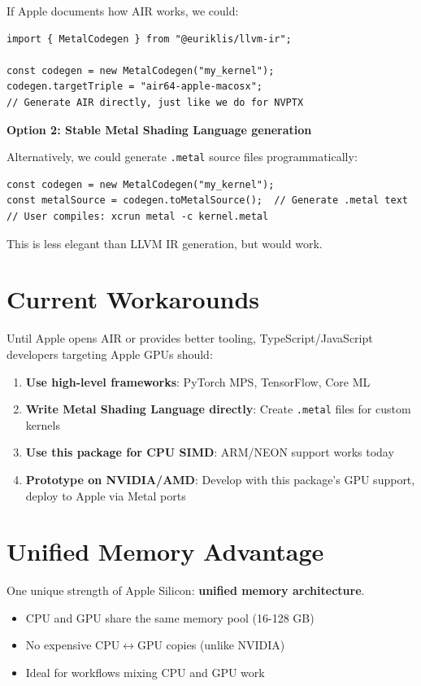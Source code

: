 \documentclass[11pt,oneside]{book}
\begin{document}
If Apple documents how AIR works\cite{airformat}, we could:
\begin{lstlisting}[style=ts]
import { MetalCodegen } from "@euriklis/llvm-ir";

const codegen = new MetalCodegen("my_kernel");
codegen.targetTriple = "air64-apple-macosx";
// Generate AIR directly, just like we do for NVPTX
\end{lstlisting}

\textbf{Option 2: Stable Metal Shading Language generation}

Alternatively, we could generate \texttt{.metal} source files programmatically\cite{metaltools}:
\begin{lstlisting}[style=ts]
const codegen = new MetalCodegen("my_kernel");
const metalSource = codegen.toMetalSource();  // Generate .metal text
// User compiles: xcrun metal -c kernel.metal
\end{lstlisting}

This is less elegant than LLVM IR generation, but would work.

\section{Current Workarounds}

Until Apple opens AIR or provides better tooling, TypeScript/JavaScript developers targeting Apple GPUs should:

\begin{enumerate}[noitemsep]
  \item \textbf{Use high-level frameworks}: PyTorch MPS, TensorFlow, Core ML
  \item \textbf{Write Metal Shading Language directly}: Create \texttt{.metal} files for custom kernels
  \item \textbf{Use this package for CPU SIMD}: ARM/NEON support works today
  \item \textbf{Prototype on NVIDIA/AMD}: Develop with this package's GPU support, deploy to Apple via Metal ports
\end{enumerate}

\section{Unified Memory Advantage}

One unique strength of Apple Silicon: \textbf{unified memory architecture}.

\begin{itemize}[noitemsep]
  \item CPU and GPU share the same memory pool (16-128 GB)
  \item No expensive CPU$\leftrightarrow$GPU copies (unlike NVIDIA)
  \item Ideal for workflows mixing CPU and GPU work
\end{itemize}
\end{document}

